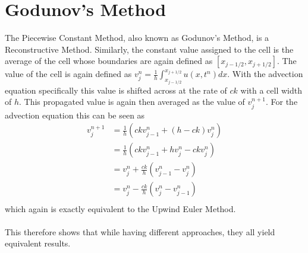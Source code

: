 \section{Godunov's Method}
The Piecewise Constant Method, also known as Godunov's Method, is a Reconstructive Method. Similarly, the constant value assigned to the cell is the average of the cell whose boundaries are again defined as $[x_{j-1/2},x_{j+1/2}]$. The value of the cell is again defined as $v^n_j=\frac{1}{h}\int_{x_{j-1/2}}^{x_{j+1/2}}u(x,t^n)dx$. With the advection equation specifically this value is shifted across at the rate of $ck$ with a cell width of $h$. This propagated value is again then averaged as the value of $v^{n+1}_j$. For the advection equation this can be seen as
\begin{align*}
  v^{n+1}_j &= \frac{1}{h}(ckv^n_{j-1} + (h-ck)v^n_j) \\
            &= \frac{1}{h}(ckv^n_{j-1} + hv^n_j - ckv^n_j) \\
            &= v^n_j + \frac{ck}{h}(v^n_{j-1} - v^n_j) \\
            &= v^n_j - \frac{ck}{h}(v^n_j - v^n_{j-1}) \\
\end{align*}
which again is exactly equivalent to the Upwind Euler Method.
\\
\\
This therefore shows that while having different approaches, they all yield equivalent results. 